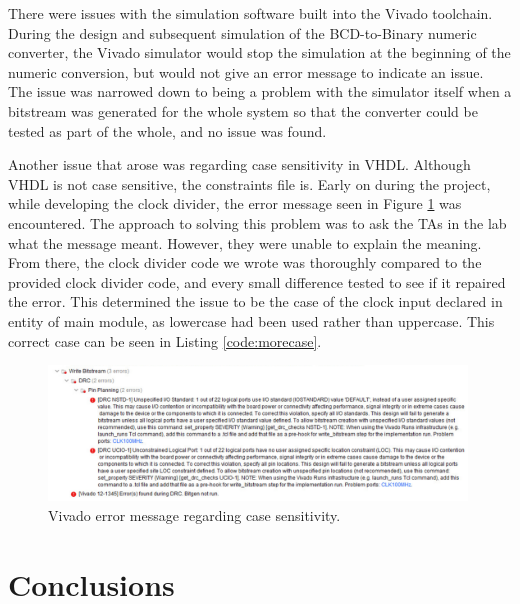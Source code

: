 \documentclass[11pt]{article}
\begin{document}
There were issues with the simulation software built into the Vivado toolchain. During the design and subsequent simulation of the BCD-to-Binary numeric converter, the Vivado simulator would stop the simulation at the beginning of the numeric conversion, but would not give an error message to indicate an issue. The issue was narrowed down to being a problem with the simulator itself when a bitstream was generated for the whole system so that the converter could be tested as part of the whole, and no issue was found.

Another issue that arose was regarding case sensitivity in VHDL. Although VHDL is not case sensitive, the constraints file is. Early on during the project, while developing the clock divider, the error message seen in Figure \ref{fig:error} was encountered. The approach to solving this problem was to ask the TAs in the lab what the message meant. However, they were unable to explain the meaning. From there, the clock divider code we wrote was thoroughly compared to the provided clock divider code, and every small difference tested to see if it repaired the error. This determined the issue to be the case of the clock input declared in entity of main module, as lowercase had been used rather than uppercase. This correct case can be seen in Listing \ref{code:morecase}.

\begin{figure}[H]
  \centering
  \includegraphics[width=0.99\textwidth]{error.png}
  \caption{Vivado error message regarding case sensitivity.}
  \label{fig:error}
\end{figure}

\section{Conclusions}

\end{document}

